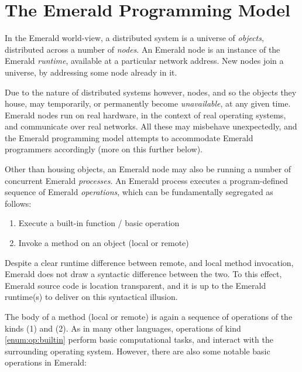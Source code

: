 \section{The Emerald Programming Model}

In the Emerald world-view, a distributed system is a universe of
\emph{objects}, distributed across a number of \emph{nodes}. An
Emerald node is an instance of the Emerald \emph{runtime}, available
at a particular network address. New nodes join a universe, by
addressing some node already in it.

Due to the nature of distributed systems however, nodes, and so the
objects they house, may temporarily, or permanently become
\emph{unavailable}, at any given time. Emerald nodes run on real
hardware, in the context of real operating systems, and communicate
over real networks. All these may misbehave unexpectedly, and the
Emerald programming model attempts to accommodate Emerald programmers
accordingly (more on this further below).

Other than housing objects, an Emerald node may also be running a
number of concurrent Emerald \emph{processes}. An Emerald process
executes a program-defined sequence of Emerald \emph{operations},
which can be fundamentally segregated as follows:

\begin{enumerate}[label=(\arabic*)]

\item Execute a built-in function / basic operation
\label{enum:op:builtin}

\item Invoke a method on an object (local or remote)
\label{enum:op:invoke}

\end{enumerate}

Despite a clear runtime difference between remote, and local method
invocation, Emerald does not draw a syntactic difference between the
two. To this effect, Emerald source code is location transparent, and
it is up to the Emerald runtime(s) to deliver on this syntactical
illusion.

The body of a method (local or remote) is again a sequence of
operations of the kinds (1) and (2). As in many other languages,
operations of kind \ref{enum:op:builtin} perform basic computational
tasks, and interact with the surrounding operating system. However,
there are also some notable basic operations in Emerald:

